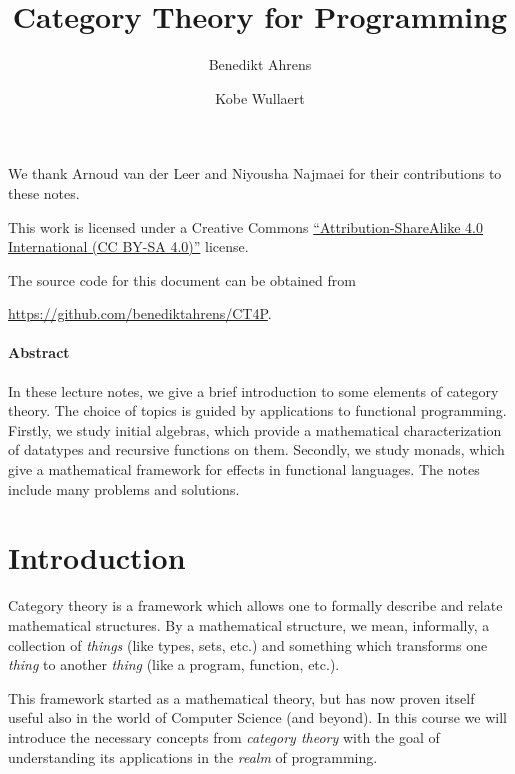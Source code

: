 \documentclass[a4paper,10pt]{scrartcl}
\title{Category Theory for Programming}
\author{Benedikt Ahrens \and Kobe Wullaert}
\date{}
\theoremstyle{plain}
\theoremstyle{definition}
\begin{document}
\maketitle

\vspace*{\fill}
We thank Arnoud van der Leer and Niyousha Najmaei for their contributions to these notes.
\vspace*{\fill}


\noindent
This work is licensed under a Creative Commons \href{https://creativecommons.org/licenses/by-sa/4.0/}{``Attribution-ShareAlike 4.0 International (CC BY-SA 4.0)''} license. \href{https://creativecommons.org/licenses/by-sa/4.0/}{\ccbysa}

\noindent
The source code for this document can be obtained from
\begin{center}
\url{https://github.com/benediktahrens/CT4P}.
\end{center}

\newpage

\paragraph*{Abstract}
In these lecture notes, we give a brief introduction to some elements of category theory.
The choice of topics is guided by applications to functional programming.
Firstly, we study initial algebras, which provide a mathematical characterization of datatypes and recursive functions on them.
Secondly, we study monads, which give a mathematical framework for effects in functional languages.
The notes include many problems and solutions.

\newpage
\tableofcontents
\newpage


\section{Introduction}

Category theory is a framework which allows one to formally describe and relate mathematical structures. By a mathematical structure, we mean, informally, a collection of \textit{things} (like types, sets, etc.) and something which transforms one \textit{thing} to another \textit{thing} (like a program, function, etc.).

This framework started as a mathematical theory, but has now proven itself useful also in the world of Computer Science (and beyond). In this course we will introduce the necessary concepts from \textit{category theory} with the goal of understanding its applications in the \textit{realm} of programming.
\end{document}
